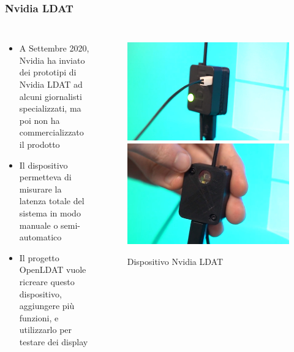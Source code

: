 \documentclass[xcolor={dvipsnames}]{beamer}
\begin{document}
\begin{frame}[shrink=10]
	\frametitle{Nvidia LDAT}
	\begin{columns}
		\begin{itemize}
			\item A Settembre 2020, Nvidia ha inviato dei prototipi di \alert{Nvidia LDAT} ad alcuni giornalisti specializzati, ma poi \alert{non ha commercializzato il prodotto}
			\item Il dispositivo permetteva di misurare la \alert{latenza totale del sistema} in modo manuale o semi-automatico
			\item Il progetto \alert{OpenLDAT} vuole ricreare questo dispositivo, aggiungere più funzioni, e utilizzarlo per testare dei display
		\end{itemize}
		\begin{figure}
			\centering
			\includegraphics[width=\textwidth]{StatoDellArte_files/nvldat_front.jpg}
			\includegraphics[width=\textwidth]{StatoDellArte_files/nvldat_back.jpg}
			\caption*{Dispositivo Nvidia LDAT}
		\end{figure}
		
	\end{columns}
	
\end{frame}
\end{document}
